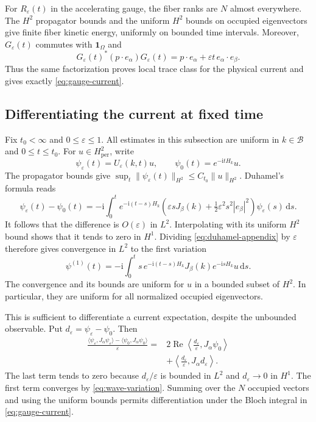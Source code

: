 \documentclass[11pt,a4paper]{article}
\newcommand{\ind}{\mathbf 1}
\newcommand{\BZ}{\mathcal B}
\newcommand{\dd}{\,\mathrm d}
\newcommand{\ii}{\mathrm i}
\DeclareMathOperator{\Rea}{Re}
\theoremstyle{remark}
\numberwithin{equation}{section}
\begin{document}
For $R_\varepsilon(t)$ in the accelerating gauge, the fiber ranks
are $N$ almost everywhere. The $H^2$ propagator bounds and the
uniform $H^2$ bounds on occupied eigenvectors give finite fiber
kinetic energy, uniformly on bounded time intervals.
Moreover, $G_\varepsilon(t)$ commutes with $\ind_\Omega$ and
\[
 G_\varepsilon(t)^*(p\cdot e_\alpha)G_\varepsilon(t)
 =p\cdot e_\alpha+\varepsilon t\,e_\alpha\cdot e_\beta.
\]
Thus the same factorization proves local trace class for the physical
current and gives exactly \eqref{eq:gauge-current}.

\subsection{Differentiating the current at fixed time}
\label{app:differentiation}

Fix $t_0<\infty$ and $0\leq\varepsilon\leq1$.
All estimates in this subsection are uniform in $k\in\BZ$ and
$0\leq t\leq t_0$. For $u\in H^2_{\mathrm{per}}$, write
\[
 \psi_\varepsilon(t)=U_\varepsilon(k,t)u,\qquad
 \psi_0(t)=e^{-\ii tH_k}u.
\]
The propagator bounds give
$\sup_t\|\psi_\varepsilon(t)\|_{H^2}\leq C_{t_0}\|u\|_{H^2}$.
Duhamel's formula reads
\begin{equation}
 \psi_\varepsilon(t)-\psi_0(t)
 =-\ii\int_0^t e^{-\ii(t-s)H_k}
       \left(\varepsilon sJ_\beta(k)
            +\tfrac12\varepsilon^2s^2|e_\beta|^2\right)
       \psi_\varepsilon(s)\dd s.
 \label{eq:duhamel-appendix}
\end{equation}
It follows that the difference is $O(\varepsilon)$ in $L^2$.
Interpolating with its uniform $H^2$ bound shows that it tends to
zero in $H^1$. Dividing \eqref{eq:duhamel-appendix} by $\varepsilon$
therefore gives convergence in $L^2$ to the first variation
\begin{equation}
 \psi^{(1)}(t)=-\ii\int_0^t s\,
       e^{-\ii(t-s)H_k}J_\beta(k)e^{-\ii sH_k}u\dd s.
 \label{eq:wave-variation}
\end{equation}
The convergence and its bounds are uniform for $u$ in a bounded
subset of $H^2$. In particular, they are uniform for all normalized
occupied eigenvectors.

This is sufficient to differentiate a current expectation, despite
the unbounded observable. Put
$d_\varepsilon=\psi_\varepsilon-\psi_0$. Then
\begin{equation}
 \begin{split}
 \frac{\langle\psi_\varepsilon,J_\alpha\psi_\varepsilon\rangle
            -\langle\psi_0,J_\alpha\psi_0\rangle}{\varepsilon}
 ={}&2\Rea\left\langle\frac{d_\varepsilon}{\varepsilon},
                                  J_\alpha\psi_0\right\rangle\\
 &+\left\langle\frac{d_\varepsilon}{\varepsilon},
                                  J_\alpha d_\varepsilon\right\rangle.
 \end{split}
 \label{eq:current-difference}
\end{equation}
The last term tends to zero because
$d_\varepsilon/\varepsilon$ is bounded in $L^2$ and
$d_\varepsilon\to0$ in $H^1$. The first term converges by
\eqref{eq:wave-variation}. Summing over the $N$ occupied vectors and
using the uniform bounds permits differentiation under the Bloch
integral in \eqref{eq:gauge-current}.
\end{document}
